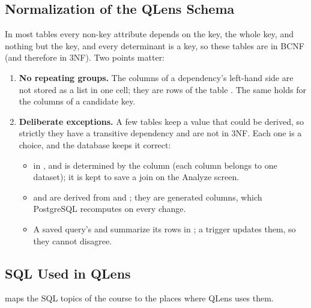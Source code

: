 \subsection{Normalization of the QLens Schema}
\label{sec:db-normal}

In most tables every non-key attribute depends on the key, the whole key, and nothing but the key, and
every determinant is a key, so these tables are in BCNF (and therefore in 3NF). Two points matter:
\begin{enumerate}
  \item \textbf{No repeating groups.} The columns of a dependency's left-hand side are not stored as a
  list in one cell; they are rows of the table . The same holds for the columns of
  a candidate key.
  \item \textbf{Deliberate exceptions.} A few tables keep a value that could be derived, so strictly
  they have a transitive dependency and are not in 3NF. Each one is a choice, and the database keeps it
  correct:
  \begin{itemize}
    \item {} in ,  and
     is determined by the column (each column belongs to one dataset); it is kept to
    save a join on the Analyze screen.
    \item {} and  are derived from  and
    ; they are generated columns, which PostgreSQL recomputes on every change.
    \item A saved query's  and  summarize its rows in
    ; a trigger updates them, so they cannot disagree.
  \end{itemize}
\end{enumerate}

\subsection{SQL Used in QLens}
\label{sec:db-sql}

 maps the SQL topics of the course to the places where QLens uses them.


